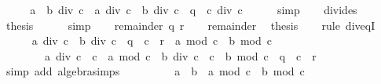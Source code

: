\begin{isabellebody}
\ \ \isamarkupfalse%
\ \isamarkupfalse%
\ {\isachardoublequoteopen}{\isacharparenleft}{\kern0pt}a\ {\isacharplus}{\kern0pt}\ b{\isacharparenright}{\kern0pt}\ div\ c\ {\isacharequal}{\kern0pt}\ {\isacharparenleft}{\kern0pt}a\ div\ c\ {\isacharplus}{\kern0pt}\ b\ div\ c\ {\isacharplus}{\kern0pt}\ q{\isacharparenright}{\kern0pt}\ {\isacharasterisk}{\kern0pt}\ c\ div\ c{\isachardoublequoteclose}\isanewline
\ \ \ \ \isamarkupfalse%
\ simp\isanewline
\ \ \isamarkupfalse%
\ divides\ \isamarkupfalse%
\ {\isacharquery}{\kern0pt}thesis\isanewline
\ \ \ \ \isamarkupfalse%
\ simp\isanewline
{}\isamarkupfalse%
\isanewline
\ \ \isamarkupfalse%
\ {\isacharparenleft}{\kern0pt}remainder\ q\ r{\isacharparenright}{\kern0pt}\isanewline
\ \ \isamarkupfalse%
\ remainder{\isacharparenleft}{\kern0pt}{}{\isacharminus}{\kern0pt}{}{\isacharparenright}{\kern0pt}\ \isamarkupfalse%
\ {\isacharquery}{\kern0pt}thesis\isanewline
\ \ \isamarkupfalse%
\ {\isacharparenleft}{\kern0pt}rule\ div{\isacharunderscore}{\kern0pt}eqI{\isacharparenright}{\kern0pt}\isanewline
\ \ \ \ \isamarkupfalse%
\ {\isachardoublequoteopen}{\isacharparenleft}{\kern0pt}a\ div\ c\ {\isacharplus}{\kern0pt}\ b\ div\ c\ {\isacharplus}{\kern0pt}\ q{\isacharparenright}{\kern0pt}\ {\isacharasterisk}{\kern0pt}\ c\ {\isacharplus}{\kern0pt}\ r\ {\isacharplus}{\kern0pt}\ {\isacharparenleft}{\kern0pt}a\ mod\ c\ {\isacharplus}{\kern0pt}\ b\ mod\ c{\isacharparenright}{\kern0pt}\ {\isacharequal}{\kern0pt}\isanewline
\ \ \ \ \ \ \ \ {\isacharparenleft}{\kern0pt}a\ div\ c\ {\isacharasterisk}{\kern0pt}\ c\ {\isacharplus}{\kern0pt}\ a\ mod\ c{\isacharparenright}{\kern0pt}\ {\isacharplus}{\kern0pt}\ {\isacharparenleft}{\kern0pt}b\ div\ c\ {\isacharasterisk}{\kern0pt}\ c\ {\isacharplus}{\kern0pt}\ b\ mod\ c{\isacharparenright}{\kern0pt}\ {\isacharplus}{\kern0pt}\ q\ {\isacharasterisk}{\kern0pt}\ c\ {\isacharplus}{\kern0pt}\ r{\isachardoublequoteclose}\isanewline
\ \ \ \ \ \ \isamarkupfalse%
\ {\isacharparenleft}{\kern0pt}simp\ add{\isacharcolon}{\kern0pt}\ algebra{\isacharunderscore}{\kern0pt}simps{\isacharparenright}{\kern0pt}\isanewline
\ \ \ \ \isamarkupfalse%
\ \isamarkupfalse%
\ {\isachardoublequoteopen}{\isasymdots}\ {\isacharequal}{\kern0pt}\ a\ {\isacharplus}{\kern0pt}\ b\ {\isacharplus}{\kern0pt}\ {\isacharparenleft}{\kern0pt}a\ mod\ c\ {\isacharplus}{\kern0pt}\ b\ mod\ c{\isacharparenright}{\kern0pt}{\isachardoublequoteclose}\isanewline

\end{isabellebody}
